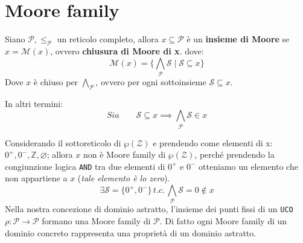 \section{Moore family}
Siano $\mathcal{P}, \leq_\mathcal{P}$ un reticolo completo, allora
$x \subseteq \mathcal{P}$ è un \textbf{insieme di Moore} se 
$x = \mathcal{M}(x)$, ovvero \textbf{chiusura di Moore di x}.
dove:
\[
  \mathcal{M}(x) =  \biggl\{\bigwedge_\mathcal{P} \mathcal{S} \mid \mathcal{S} \subseteq x\biggr\}
\]
Dove $x$ è chiuso per $\bigwedge_\mathcal{P}$, ovvero per ogni sottoinsieme $\mathcal{S} \subseteq x$.

In altri termini:
\[
  Sia \qquad \mathcal{S} \subseteq x \implies \bigwedge_\mathcal{P} \mathcal{S} \in x  
\]

\begin{figure}[H]
    \centering
\end{figure}
Considerando il sottoreticolo di $\wp(\mathcal{Z})$ e prendendo come elementi di x: $0^+, 0^-,
\mathbb{Z}, \varnothing$;  allora $x$ non è Moore family di $\wp(\mathcal{Z})$, perché prendendo
la congiunzione logica \texttt{AND} tra due elementi di $0^+$ e  $0^-$ otteniamo un elemento che 
non appartiene a $x$ (\textit{tale elemento è lo zero}).
\[
  \exists \mathcal{S} = \{ 0^+, 0^- \} \, t.c. \, \bigwedge_\mathcal{P} \mathcal{S} = 0 \notin x
\]
Nella nostra concezione di dominio astratto, l'insieme dei punti fissi di un \texttt{UCO} 
$\rho:  \mathcal{P} \to \mathcal{P}$ formano una Moore family di $\mathcal{P}$. Di fatto ogni Moore family di un 
dominio concreto rappresenta una proprietà di un dominio astratto.


